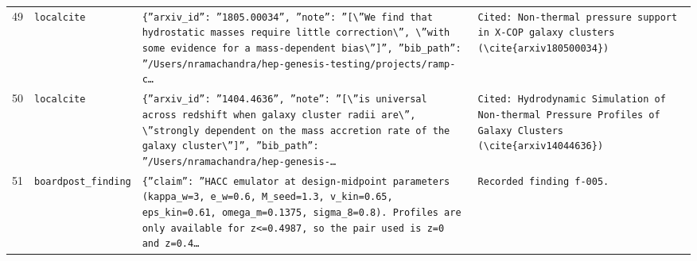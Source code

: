 \documentclass[11pt,a4paper]{article}
\begin{document}
\begin{longtable}{@{}p{}p{}p{}p{}@{}}
49 & \texttt{local}\newline\texttt{cite} & \texttt{\{''arxiv\_\allowbreak{}id'':\allowbreak{} ''1805.00034'',\allowbreak{} ''note'':\allowbreak{} ''[\textbackslash{}\allowbreak{}''We find that hydrostatic masses require little correction\textbackslash{}\allowbreak{}'',\allowbreak{} \textbackslash{}\allowbreak{}''with some evidence for a mass-dependent bias\textbackslash{}\allowbreak{}'']\allowbreak{}'',\allowbreak{} ''bib\_\allowbreak{}path'':\allowbreak{} ''/\allowbreak{}Users/\allowbreak{}nramachandra/\allowbreak{}hep-genesis-testing/\allowbreak{}projects/\allowbreak{}ramp-c\ldots{}\allowbreak{}} & \texttt{Cited:\allowbreak{} Non-thermal pressure support in X-COP galaxy clusters (\textbackslash{}\allowbreak{}cite\{arxiv180500034\}\allowbreak{})\allowbreak{}} \\
50 & \texttt{local}\newline\texttt{cite} & \texttt{\{''arxiv\_\allowbreak{}id'':\allowbreak{} ''1404.4636'',\allowbreak{} ''note'':\allowbreak{} ''[\textbackslash{}\allowbreak{}''is universal across redshift when galaxy cluster radii are\textbackslash{}\allowbreak{}'',\allowbreak{} \textbackslash{}\allowbreak{}''strongly dependent on the mass accretion rate of the galaxy cluster\textbackslash{}\allowbreak{}'']\allowbreak{}'',\allowbreak{} ''bib\_\allowbreak{}path'':\allowbreak{} ''/\allowbreak{}Users/\allowbreak{}nramachandra/\allowbreak{}hep-genesis-\ldots{}\allowbreak{}} & \texttt{Cited:\allowbreak{} Hydrodynamic Simulation of Non-thermal Pressure Profiles of Galaxy Clusters (\textbackslash{}\allowbreak{}cite\{arxiv14044636\}\allowbreak{})\allowbreak{}} \\
51 & \texttt{board}\newline\texttt{post\_\allowbreak{}finding} & \texttt{\{''claim'':\allowbreak{} ''HACC emulator at design-midpoint parameters (kappa\_\allowbreak{}w=\allowbreak{}3,\allowbreak{} e\_\allowbreak{}w=\allowbreak{}0.6,\allowbreak{} M\_\allowbreak{}seed=\allowbreak{}1.3,\allowbreak{} v\_\allowbreak{}kin=\allowbreak{}0.65,\allowbreak{} eps\_\allowbreak{}kin=\allowbreak{}0.61,\allowbreak{} omega\_\allowbreak{}m=\allowbreak{}0.1375,\allowbreak{} sigma\_\allowbreak{}8=\allowbreak{}0.8)\allowbreak{}. Profiles are only available for z\textless{}\allowbreak{}=\allowbreak{}0.4987,\allowbreak{} so the pair used is z=\allowbreak{}0 and z=\allowbreak{}0.4\ldots{}\allowbreak{}} & \texttt{Recorded finding f-005.} \\

\end{longtable}
\end{document}
